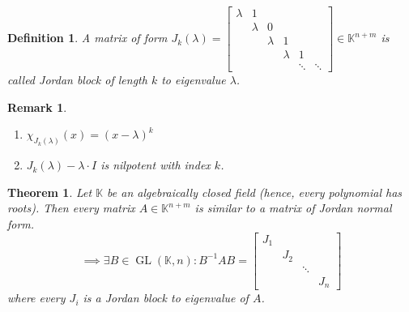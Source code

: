 \documentclass[a4paper]{article}
\newcounter{lecref}[section]
\numberwithin{lecref}{section}
\newtheorem{theorem}[lecref]{Theorem}
\newtheorem{definition}[lecref]{Definition}
\newtheorem{remark}[lecref]{Remark}
\begin{document}
\begin{definition} %
  A matrix of form $J_k(\lambda) = \begin{bmatrix}
    \lambda & 1 & & & & \\
    & \lambda & 0 & & & \\
    & & \lambda & 1 & & \\
    & & & \lambda & 1 & \\
    & & & & \ddots & \ddots
  \end{bmatrix} \in \mathbb K^{n+m}$
  is called \emph{Jordan block} of length $k$ to eigenvalue $\lambda$.
\end{definition}

\begin{remark} %
  \begin{enumerate}
    \item $\chi_{J_k(\lambda)}(x) = (x - \lambda)^k$
    \item $J_k(\lambda) - \lambda \cdot I$ is nilpotent with index $k$.
  \end{enumerate}
\end{remark}

\begin{theorem} %
  Let $\mathbb K$ be an algebraically closed field (hence, every polynomial has roots).
  Then every matrix $A \in \mathbb K^{n+m}$ is similar to a matrix of Jordan normal form.
  \[
    \implies \exists B \in \operatorname{GL}(\mathbb K, n): B^{-1} AB =
    \begin{bmatrix}
      J_1 & & & \\
        & J_2 & & \\
        & & \ddots & \\
        & & & J_n
    \end{bmatrix}
  \]
  where every $J_i$ is a Jordan block to eigenvalue of $A$.
\end{theorem}
\end{document}
